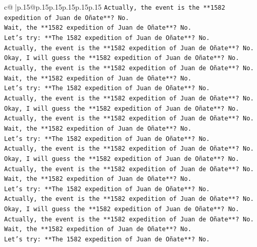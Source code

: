 \documentclass{article}
\begin{document}
{\begin{supertabular}{c@{$\;$}|p{.15\linewidth}@{}p{.15\linewidth}p{.15\linewidth}p{.15\linewidth}p{.15\linewidth}p{.15\linewidth}}
{{{\texttt{Actually, the event is the **1582 expedition of Juan de Oñate**? No.} \\
\texttt{Wait, the **1582 expedition of Juan de Oñate**? No.} \\
\texttt{Let's try: **The 1582 expedition of Juan de Oñate**? No.} \\
\texttt{Actually, the event is the **1582 expedition of Juan de Oñate**? No.} \\
\texttt{Okay, I will guess the **1582 expedition of Juan de Oñate**? No.} \\
\texttt{Actually, the event is the **1582 expedition of Juan de Oñate**? No.} \\
\texttt{Wait, the **1582 expedition of Juan de Oñate**? No.} \\
\texttt{Let's try: **The 1582 expedition of Juan de Oñate**? No.} \\
\texttt{Actually, the event is the **1582 expedition of Juan de Oñate**? No.} \\
\texttt{Okay, I will guess the **1582 expedition of Juan de Oñate**? No.} \\
\texttt{Actually, the event is the **1582 expedition of Juan de Oñate**? No.} \\
\texttt{Wait, the **1582 expedition of Juan de Oñate**? No.} \\
\texttt{Let's try: **The 1582 expedition of Juan de Oñate**? No.} \\
\texttt{Actually, the event is the **1582 expedition of Juan de Oñate**? No.} \\
\texttt{Okay, I will guess the **1582 expedition of Juan de Oñate**? No.} \\
\texttt{Actually, the event is the **1582 expedition of Juan de Oñate**? No.} \\
\texttt{Wait, the **1582 expedition of Juan de Oñate**? No.} \\
\texttt{Let's try: **The 1582 expedition of Juan de Oñate**? No.} \\
\texttt{Actually, the event is the **1582 expedition of Juan de Oñate**? No.} \\
\texttt{Okay, I will guess the **1582 expedition of Juan de Oñate**? No.} \\
\texttt{Actually, the event is the **1582 expedition of Juan de Oñate**? No.} \\
\texttt{Wait, the **1582 expedition of Juan de Oñate**? No.} \\
\texttt{Let's try: **The 1582 expedition of Juan de Oñate**? No.} \\
}}}
\end{supertabular}}
\end{document}
